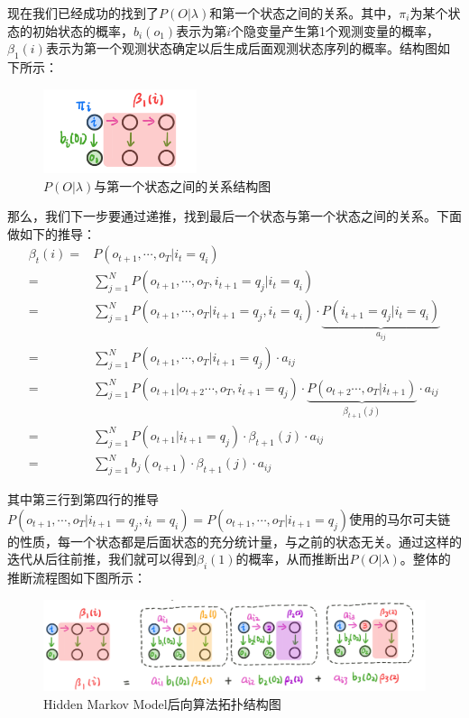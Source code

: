 \documentclass[a4paper]{article}
\begin{document}
现在我们已经成功的找到了$P(O|\lambda)$和第一个状态之间的关系。其中，$\pi_i$为某个状态的初始状态的概率，$b_i(o_1)$表示为第$i$个隐变量产生第1个观测变量的概率，$\beta_1(i)$表示为第一个观测状态确定以后生成后面观测状态序列的概率。结构图如下所示：
\begin{figure}[H]
    \centering
    \includegraphics[width=0.4\textwidth]{微信图片_20200108154910.png}
    \caption{$P(O|\lambda)$与第一个状态之间的关系结构图}
    \label{fig:my_label_1}
\end{figure}

那么，我们下一步要通过递推，找到最后一个状态与第一个状态之间的关系。下面做如下的推导：
\begin{equation}
    \begin{split}
        \beta_t(i) 
        = & P(o_{t+1},\cdots,o_T|i_t = q_i)  \\
        = & \sum_{j=1}^N P(o_{t+1},\cdots,o_T, i_{t+1} = q_j|i_t = q_i) \\
        = & \sum_{j=1}^N P(o_{t+1},\cdots,o_T |i_{t+1} = q_j, i_t = q_i)\cdot \underbrace{P(i_{t+1} = q_j|i_t = q_i)}_{a_{ij}} \\
        = & \sum_{j=1}^N P(o_{t+1},\cdots,o_T |i_{t+1} = q_j)\cdot a_{ij} \\
        = & \sum_{j=1}^N P(o_{t+1}|o_{t+2} \cdots,o_T,i_{t+1} = q_j)\cdot \underbrace{P(o_{t+2} \cdots,o_T|i_{t+1})}_{\beta_{t+1}(j)} \cdot a_{ij} \\
        = & \sum_{j=1}^N P(o_{t+1}|i_{t+1} = q_j ) \cdot \beta_{t+1}(j)\cdot a_{ij} \\
        = & \sum_{j=1}^N b_j(o_{t+1}) \cdot \beta_{t+1}(j)\cdot a_{ij}
    \end{split}
\end{equation}

其中第三行到第四行的推导$P(o_{t+1},\cdots,o_T |i_{t+1} = q_j, i_t = q_i) = P(o_{t+1},\cdots,o_T |i_{t+1} = q_j)$使用的马尔可夫链的性质，每一个状态都是后面状态的充分统计量，与之前的状态无关。通过这样的迭代从后往前推，我们就可以得到$\beta_i(1)$的概率，从而推断出$P(O|\lambda)$。整体的推断流程图如下图所示：
\begin{figure}[H]
    \centering
    \includegraphics[width=1\textwidth]{微信图片_20200109151358.png}
    \caption{Hidden Markov Model后向算法拓扑结构图}
    \label{fig:my_label_1}
\end{figure}
\end{document}

